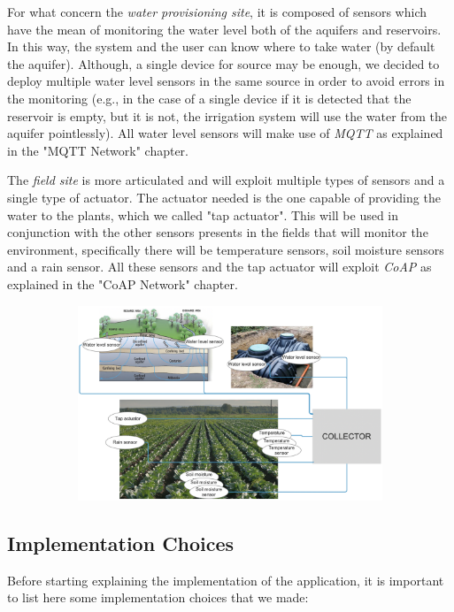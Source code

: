 For what concern the \textit{water provisioning site}, it is composed of sensors which have the mean of monitoring the water level both of the aquifers and reservoirs. In this way, the system and the user can know where to take water (by default the aquifer). Although, a single device for source may be enough, we decided to deploy multiple water level sensors in the same source in order to avoid errors in the monitoring (e.g., in the case of a single device if it is detected that the reservoir is empty, but it is not, the irrigation system will use the water from the aquifer pointlessly).
All water level sensors will make use of \textit{MQTT} as explained in the "MQTT Network" chapter.


The \textit{field site} is more articulated and will exploit multiple types of sensors and a single type of actuator. The actuator needed is the one capable of providing the water to the plants, which we called "tap actuator". This will be used in conjunction with the other sensors presents in the fields that will monitor the environment, specifically there will be temperature sensors, soil moisture sensors and a rain sensor. 
All these sensors and the tap actuator will exploit \textit{CoAP} as explained in the "CoAP Network" chapter.


\begin{figure}[H]
	\begin{subfigure}{\textwidth}
	\centering
		\includegraphics[width=1\linewidth]{img/deployment.png} 
	\end{subfigure}
\end{figure}



\subsection{Implementation Choices}
Before starting explaining the implementation of the application, it is important to list here some implementation choices that we made:

